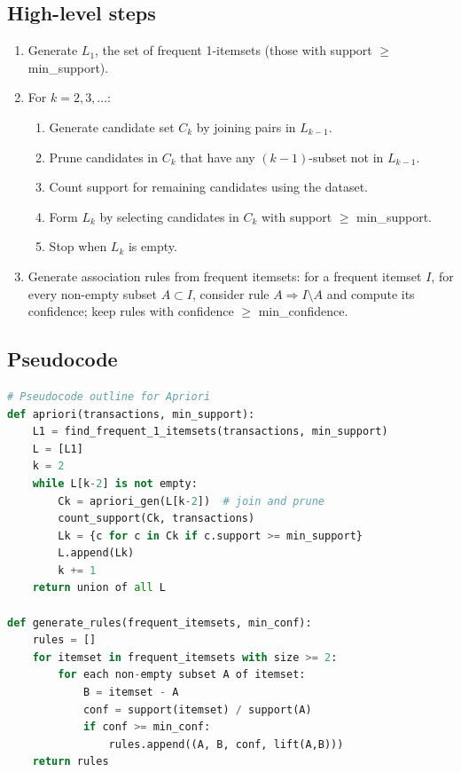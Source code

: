 \documentclass[12pt,a4paper]{report}
\begin{document}
\subsection{High-level steps}
\begin{enumerate}[nosep]
  \item Generate \(L_1\), the set of frequent 1-itemsets (those with support \(\geq\) min\_support).
  \item For \(k = 2, 3, \ldots:\)
    \begin{enumerate}[nosep]
      \item Generate candidate set \(C_k\) by joining pairs in \(L_{k-1}\).
      \item Prune candidates in \(C_k\) that have any \((k-1)\)-subset not in \(L_{k-1}\).
      \item Count support for remaining candidates using the dataset.
      \item Form \(L_k\) by selecting candidates in \(C_k\) with support \(\geq\) min\_support.
      \item Stop when \(L_k\) is empty.
    \end{enumerate}
  \item Generate association rules from frequent itemsets: for a frequent itemset \(I\), for every non-empty subset \(A \subset I\), consider rule \(A \Rightarrow I\setminus A\) and compute its confidence; keep rules with confidence \(\geq\) min\_confidence.
\end{enumerate}

\subsection{Pseudocode}
\begin{lstlisting}[language=Python, caption={Apriori pseudocode (outline)}]
# Pseudocode outline for Apriori
def apriori(transactions, min_support):
    L1 = find_frequent_1_itemsets(transactions, min_support)
    L = [L1]
    k = 2
    while L[k-2] is not empty:
        Ck = apriori_gen(L[k-2])  # join and prune
        count_support(Ck, transactions)
        Lk = {c for c in Ck if c.support >= min_support}
        L.append(Lk)
        k += 1
    return union of all L

def generate_rules(frequent_itemsets, min_conf):
    rules = []
    for itemset in frequent_itemsets with size >= 2:
        for each non-empty subset A of itemset:
            B = itemset - A
            conf = support(itemset) / support(A)
            if conf >= min_conf:
                rules.append((A, B, conf, lift(A,B)))
    return rules
\end{lstlisting}
\end{document}

